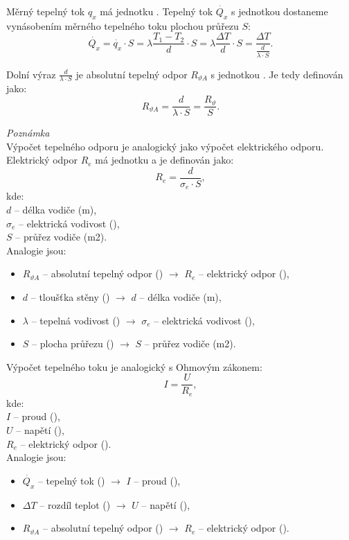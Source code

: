 \documentclass{article}
\begin{document}
Měrný tepelný tok $q_x$ má jednotku \ueqWandMinvsq. Tepelný tok $\dot{Q_x}$ s jednotkou \ueqW \fs dostaneme vynásobením měrného tepelného toku plochou průřezu $S$:
$$
    \dot{Q_x} = \dot{q_x} \cdot S = \lambda \frac{T_1 - T_2}{d} \cdot S = \lambda \frac{\Delta T}{d} \cdot S = \frac{\Delta T}{\frac{d}{\lambda \cdot S}}.
$$

Dolní výraz $\frac{d}{\lambda \cdot S}$ je absolutní tepelný odpor $R_{\vartheta A}$ s jednotkou \ueqKandWinv. Je tedy definován jako:
$$
    R_{\vartheta A} = \frac{d}{\lambda \cdot S} = \frac{R_{\vartheta}}{S}.
$$

\textit{Poznámka}\\

Výpočet tepelného odporu je analogický jako výpočet elektrického odporu. Elektrický odpor $R_e$ má jednotku \ueqOHM \fs a je definován jako:
$$
    R_e = \frac{d}{\sigma_e \cdot S},
$$
kde:\\
$d$ -- délka vodiče (m),\\
$\sigma_e$ -- elektrická vodivost (\ueqMandOHMinv),\\
$S$ -- průřez vodiče (m2).\\

Analogie jsou:
\begin{itemize}
    \item $R_{\vartheta A}$ -- absolutní tepelný odpor (\ueqKandWinv) $\rightarrow$ $R_e$ -- elektrický odpor (\ueqOHM),
    \item $d$ -- tloušťka stěny (\ueqM) $\rightarrow$ $d$ -- délka vodiče (m),
    \item $\lambda$ -- tepelná vodivost (\ueqWandMinvsqKinv) $\rightarrow$ $\sigma_e$ -- elektrická vodivost (\ueqMandOHMinv),
    \item $S$ -- plocha průřezu (\ueqMsq) $\rightarrow$ $S$ -- průřez vodiče (m2).
\end{itemize}

Výpočet tepelného toku je analogický s Ohmovým zákonem:
$$
    I = \frac{U}{R_e},
$$
kde:\\
$I$ -- proud (\ueqA),\\
$U$ -- napětí (\ueqV),\\
$R_e$ -- elektrický odpor (\ueqOHM).\\

Analogie jsou:
\begin{itemize}
    \item $\dot{Q_x}$ -- tepelný tok (\ueqW) $\rightarrow$ $I$ -- proud (\ueqA),
    \item $\Delta T$ -- rozdíl teplot (\ueqK) $\rightarrow$ $U$ -- napětí (\ueqV),
    \item $R_{\vartheta A}$ -- absolutní tepelný odpor (\ueqKandWinv) $\rightarrow$ $R_e$ -- elektrický odpor (\ueqOHM).
\end{itemize}
\end{document}
